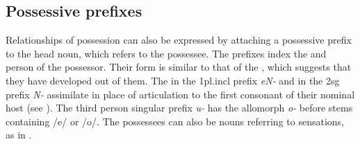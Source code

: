 \begin{table}
\end{table}


\subsection{Possessive prefixes}
\largerpage 
Relationships of possession can also be expressed by attaching a possessive prefix to the head noun, which refers to the possessee. The prefixes index the  and person of the possessor. Their form is similar to that of the , which suggests that they have developed out of them. The  in the {\sc 1pl.incl} prefix \emph{eN-} and in the {\sc 2sg} prefix \emph{N-} assimilate in place of articulation to the first consonant of their nominal host (see \Next). The third person singular prefix \emph{u-} has the allomorph \emph{o-} before stems containing /e/ or /o/. The possessees can also be nouns referring to sensations, as in \Next[a]. 

